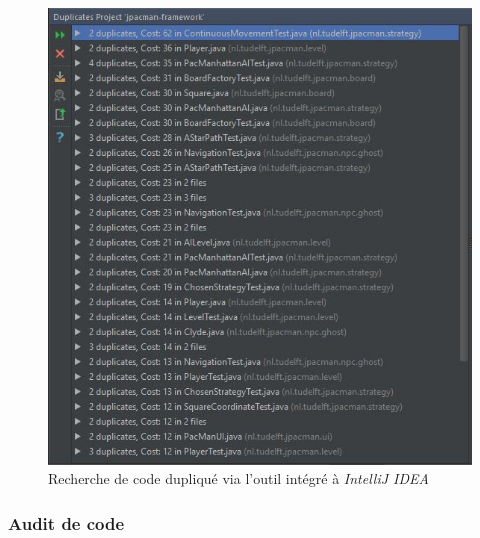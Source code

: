 \documentclass[12pt, openany]{report}
\begin{document}
\begin{figure}[h]
	\centering
	\includegraphics{Images/duplicate_analysis.JPG}
	\caption{\label{duplicate} Recherche de code dupliqué via l'outil intégré à \textit{IntelliJ IDEA}}
\end{figure}

\subsubsection{Audit de code}
\end{document}
